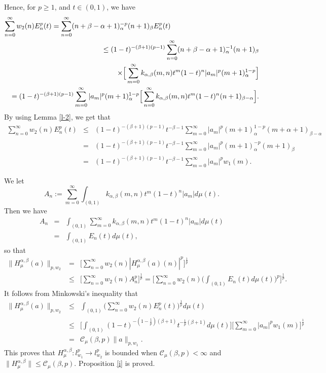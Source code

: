 \documentclass[10pt]{amsart}
\theoremstyle{definition}
\theoremstyle{question}
\numberwithin{equation}{section}
\begin{document}
Hence, for $p\geq 1$, and $t\in (0,1)$, we have
\begin{eqnarray}
\lefteqn{\sum_{n=0}^{\infty}w_2(n)E_n^p(t)=\sum_{n=0}^{\infty}(n+\beta-\alpha+1)_{\alpha}^{-p} (n+1)_{\beta}E_n^p(t)}\nonumber \\
&& \leq (1-t)^{-(\beta+1)(p-1)}\sum_{n=0}^{\infty}(n+\beta-\alpha+1)_{\alpha}^{-1}(n+1)_{\beta} \nonumber \\
&& \qquad\quad\quad \times\Big[\sum_{m=0}^{\infty}k_{\alpha, \beta}(m,n)t^m (1-t)^n|a_m|^p(m+1)_{\alpha}^{1-p}\Big] \nonumber \\
&&= (1-t)^{-(\beta+1)(p-1)}\sum_{m=0}^{\infty}|a_m|^p(m+1)_{\alpha}^{1-p}\Big[\sum_{n=0}^{\infty}k_{\alpha, \beta}(m,n)t^m (1-t)^n (n+1)_{\beta-\alpha}\Big].\nonumber 
\end{eqnarray}
 By using Lemma \ref{l-2}, we get that
\begin{eqnarray}
 \sum_{n=0}^{\infty}w_2(n)E_n^p(t)&\leq&  (1-t)^{-(\beta+1)(p-1)}t^{-\beta-1}\sum_{m=0}^{\infty}|a_m|^p(m+1)_{\alpha}^{1-p}(m+\alpha+1)_{\beta-\alpha}
 \nonumber \\
 &=&  (1-t)^{-(\beta+1)(p-1)}t^{-\beta-1}\sum_{m=0}^{\infty}|a_m|^p(m+1)_{\alpha}^{-p}(m+1)_{\beta}
 \nonumber \\
 &=& (1-t)^{-(\beta+1)(p-1)}t^{-\beta-1}\sum_{m=0}^{\infty}|a_m|^p w_1(m).  \nonumber\end{eqnarray}

We let 
$$A_n:=\sum_{m=0}^{\infty}\int_{(0,1)}k_{\alpha, \beta}(m,n)t^m (1-t)^n|a_m|d\mu(t).$$
Then we have \begin{eqnarray}
A_n&=& \int_{(0,1)}\sum_{m=0}^{\infty}k_{\alpha, \beta}(m,n)t^m (1-t)^n|a_m|d\mu(t) \nonumber \\
&=&  \int_{(0,1)}E_n(t)d\mu(t), \nonumber
\end{eqnarray}
so that 
\begin{eqnarray}
\|H_{\mu}^{\alpha, \beta}(a)\|_{p, w_2}&=& \Big[\sum_{n=0}^{\infty}w_2(n)|H_{\mu}^{\alpha, \beta}(a)(n)|^{p}\Big]^{\frac{1}{p}}\nonumber  \\
&\leq&  \Big[\sum_{n=0}^{\infty}w_2(n)A_n^{p}\Big]^{\frac{1}{p}}=\Big[\sum_{n=0}^{\infty}w_2(n)\Big(\int_{(0,1)}E_n(t)d\mu(t)\Big)^{p}\Big]^{\frac{1}{p}}. \nonumber
\end{eqnarray}
It follows from Minkowski's inequality that
\begin{eqnarray}
\|H_{\mu}^{\alpha, \beta}(a)\|_{p, w_2}&\leq & \int_{(0,1)}\Big(\sum_{n=0}^{\infty}w_2(n)E_n^p(t)\Big)^{\frac{1}{p}}d\mu(t)\nonumber \\
&\leq & \Big[\int_{(0,1)}(1-t)^{-(1-\frac{1}{p})(\beta+1)}t^{-\frac{1}{p}(\beta+1)}d\mu(t)\Big]\Big[\sum_{m=0}^{\infty}|a_m|^p w_1(m)\Big]^{\frac{1}{p}}\nonumber \\
&=& \mathcal{C}_{\mu}(\beta,p)\|a\|_{p, w_1}. \nonumber 
\end{eqnarray}
This proves that $H_{\mu}^{\alpha, \beta}: l_{w_1}^{p} \rightarrow l_{w_2}^{p}$ is bounded when $\mathcal{C}_{\mu}(\beta,p)<\infty$ and $\|H_{\mu}^{\alpha, \beta}\|\leq \mathcal{C}_{\mu}(\beta,p).$ Proposition \ref{i} is proved.
\end{document}
